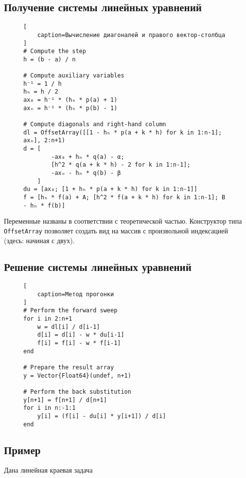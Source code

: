 \documentclass{article}
\numberwithin{equation}{section}
\begin{document}
\subsection{Получение системы линейных уравнений}

\begin{figure}[H]
\begin{lstlisting}[
    caption=Вычисление диагоналей и правого вектор-столбца
]
# Compute the step
h = (b - a) / n

# Compute auxiliary variables
h⁻¹ = 1 / h
hₕ = h / 2
ax₀ = h⁻¹ * (hₕ * p(a) + 1)
axₙ = h⁻¹ * (hₕ * p(b) - 1)

# Compute diagonals and right-hand column
dl = OffsetArray([[1 - hₕ * p(a + k * h) for k in 1:n-1]; axₙ], 2:n+1)
d = [
        -ax₀ + hₕ * q(a) - α;
        [h^2 * q(a + k * h) - 2 for k in 1:n-1];
        -axₙ - hₕ * q(b) - β
    ]
du = [ax₀; [1 + hₕ * p(a + k * h) for k in 1:n-1]]
f = [hₕ * f(a) + A; [h^2 * f(a + k * h) for k in 1:n-1]; B - hₕ * f(b)]
\end{lstlisting}
\end{figure}

Переменные названы в соответствии с теоретической частью. Конструктор типа \texttt{OffsetArray} позволяет создать вид на массив с произвольной индексацией (здесь: начиная с двух).

\subsection{Решение системы линейных уравнений}

\begin{figure}[H]
\begin{lstlisting}[
    caption=Метод прогонки
]
# Perform the forward sweep
for i in 2:n+1
    w = dl[i] / d[i-1]
    d[i] = d[i] - w * du[i-1]
    f[i] = f[i] - w * f[i-1]
end

# Prepare the result array
y = Vector{Float64}(undef, n+1)

# Perform the back substitution
y[n+1] = f[n+1] / d[n+1]
for i in n:-1:1
    y[i] = (f[i] - du[i] * y[i+1]) / d[i]
end
\end{lstlisting}
\end{figure}

\subsection{Пример}

Дана линейная краевая задача
\end{document}
